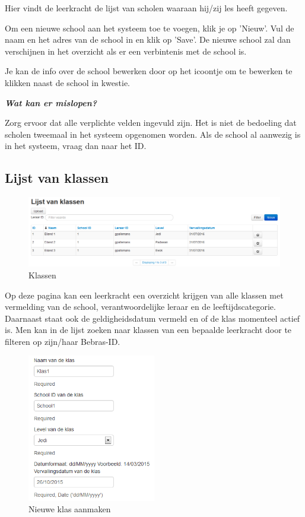 \documentclass[]{article}
\begin{document}
Hier vindt de leerkracht de lijst van scholen waaraan hij/zij les heeft gegeven.

Om een nieuwe school aan het systeem toe te voegen, klik je op 'Nieuw'. Vul de naam en het adres van de school in en klik op 'Save'. De nieuwe school zal dan verschijnen in het overzicht als er een verbintenis met de school is.

Je kan de info over de school bewerken door op het icoontje om te bewerken te klikken naast de school in kwestie.

\textbf{\textit{Wat kan er mislopen?}}

Zorg ervoor dat alle verplichte velden ingevuld zijn. Het is niet de bedoeling dat scholen tweemaal in het systeem opgenomen worden. Als de school al aanwezig is in het systeem, vraag dan naar het ID.

\subsection{Lijst van klassen}

\begin{figure}[!ht]
	\centering
	\includegraphics[width=1\textwidth]{img/classes}
	\caption{Klassen}
	\label{classes}
\end{figure}

Op deze pagina kan een leerkracht een overzicht krijgen van alle klassen met vermelding van de school, verantwoordelijke leraar en de leeftijdscategorie. Daarnaast staat ook de geldigheidsdatum vermeld en of de klas momenteel actief is.
Men kan in de lijst zoeken naar klassen van een bepaalde leerkracht door te filteren op zijn/haar Bebras-ID.

\begin{figure}[!ht]
	\centering
	\includegraphics[width=0.5\textwidth]{img/new_class}
	\caption{Nieuwe klas aanmaken}
	\label{new_class}
\end{figure}
\end{document}
